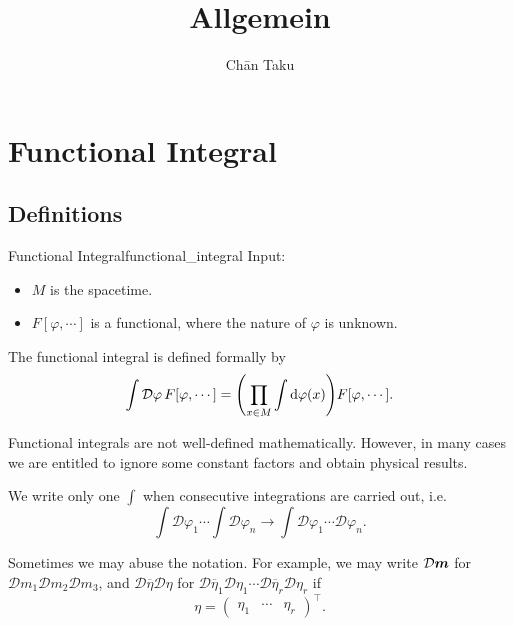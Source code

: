 \documentclass{article}
\title{Allgemein}
\author{Ch\=an Taku}
\begin{document}
\maketitle

\section{Functional Integral}

\subsection{Definitions}

\begin{definition}{Functional Integral}{functional_integral}
    Input:
    \begin{itemize}[nosep]
        \item $M$ is the spacetime.
        \item $F[\varphi,\cdots]$ is a functional, where the nature of $\varphi$ is unknown.
    \end{itemize}
    The functional integral is defined formally by
    \begin{align*}
        \int \mathcal{D}{\varphi}\, F[\varphi,\cdots] = \qty(\prod_{x\in M}\int \dd{\varphi(x)}) F[\varphi,\cdots].
    \end{align*}
\end{definition}

Functional integrals are not well-defined mathematically.
However, in many cases we are entitled to ignore some constant factors and obtain physical results.

We write only one $\int$ when consecutive integrations are carried out, i.e.
\[ \int \mathcal{D}\varphi_1 \cdots \int \mathcal{D}\varphi_n \rightarrow \int \mathcal{D}\varphi_1 \cdots \mathcal{D}\varphi_n. \]

Sometimes we may abuse the notation.
For example, we may write $\mathcal{D}\vb*{m}$ for $\mathcal{D}m_1\mathcal{D}m_2\mathcal{D}m_3$,
and $\mathcal{D}{\overline{\eta}} \mathcal{D}{\eta}$ for $\mathcal{D}\overline{\eta}_1 \mathcal{D}{\eta}_1 \cdots \mathcal{D}\overline{\eta}_r \mathcal{D}{\eta}_r$ if
\[ \eta = \begin{pmatrix} \eta_1 & \cdots & \eta_r \end{pmatrix}^\intercal. \]
\end{document}

